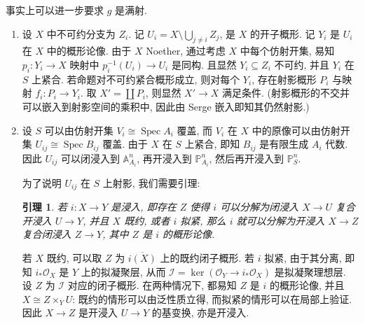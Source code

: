 \documentclass{article}
\theoremstyle{exercise}
\theoremstyle{plain}
\newtheorem*{lemma*}{引理}
\theoremstyle{remark}
\newenvironment{proofc}{\proof}{\endproof}
\def\A{\mathbb{A}}
\def\P{\mathbb{P}}
\def\sO{\mathscr{O}}
\def\Spec{\operatorname{Spec}}
\begin{document}
\begin{proofc}
  事实上可以进一步要求 $g$ 是满射.
  \begin{enumerate}[label=(\alph*)]
    \item 设 $X$ 中不可约分支为 $Z_i$.
          记 $U_i = X \setminus \bigcup_{j \neq i} Z_j$, 是 $X$ 的开子概形.
          记 $Y_i$ 是 $U_i$ 在 $X$ 中的概形论像.
          由于 $X$ Noether, 通过考虑 $X$ 中每个仿射开集,
          易知 $p_i \colon Y_i \to X$ 映射中 $p_i^{-1}(U_i) \to U_i$ 是同构.
          且显然 $Y_i \subseteq Z_i$ 不可约, 并且 $Y_i$ 在 $S$ 上紧合.
          若命题对不可约紧合概形成立, 则对每个 $Y_i$,
          存在射影概形 $P_i$ 与映射 $f_i \colon P_i \to Y_i$.
          取 $X' = \coprod P_i$, 则显然 $X' \to X$ 满足条件.
          (射影概形的不交并可以嵌入到射影空间的乘积中, 因此由 Serge 嵌入即知其仍然射影.)
    \item 设 $S$ 可以由仿射开集 $V_i \cong \Spec A_i$ 覆盖,
          而 $V_i$ 在 $X$ 中的原像可以由仿射开集 $U_{ij} \cong \Spec B_{ij}$ 覆盖.
          由于 $X$ 在 $S$ 上紧合, 即知 $B_{ij}$ 是有限生成 $A_i$ 代数.
          因此 $U_{ij}$ 可以闭浸入到 $\A_{A_i}^n$,
          再开浸入到 $\P_{A_i}^n$, 然后再开浸入到 $\P_S^n$.

          为了说明 $U_{ij}$ 在 $S$ 上射影, 我们需要引理:

          \begin{lemma*}
            若 $i \colon X \to Y$ 是浸入, 即存在 $Z$ 使得 $i$ 可以分解为闭浸入 $X \to U$
            复合开浸入 $U \to Y$, 并且 $X$ 既约, 或者 $i$ 拟紧,
            那么 $i$ 就可以分解为开浸入 $X \to Z$ 复合闭浸入 $Z \to Y$,
            其中 $Z$ 是 $i$ 的概形论像.
          \end{lemma*}

          \begin{proofc}
            若 $X$ 既约, 可以取 $Z$ 为 $\overline{i(X)}$ 上的既约闭子概形.
            若 $i$ 拟紧, 由于其分离, 即知 $i_*\sO_X$ 是 $Y$ 上的拟凝聚层,
            从而 $\mathcal{I} = \ker(\sO_Y \to i_*\sO_X)$ 是拟凝聚理想层.
            设 $Z$ 为 $\mathcal{I}$ 对应的闭子概形.
            在两种情况下, 都易知 $Z$ 是 $i$ 的概形论像, 并且 $X \cong Z \times_Y U$:
            既约的情形可以由泛性质立得, 而拟紧的情形可以在局部上验证.
            因此 $X \to Z$ 是开浸入 $U \to Y$ 的基变换, 亦是开浸入.
          \end{proofc}


\end{enumerate}
\end{proofc}
\end{document}
